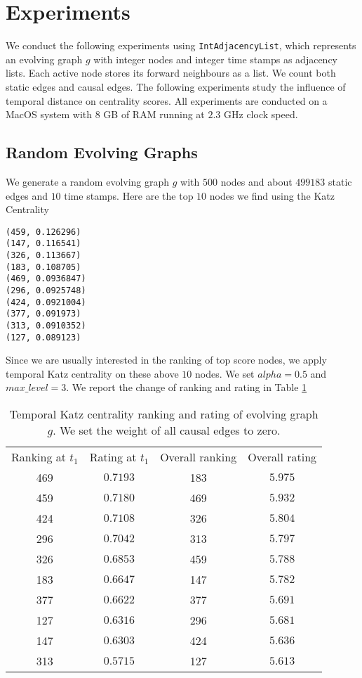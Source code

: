 \documentclass[12pt]{article}
\theoremstyle{definition}
\begin{document}
\section{Experiments}
\label{sec:experiments}

We conduct the following experiments using \texttt{IntAdjacencyList}, which represents an evolving graph $g$ with integer nodes and integer time stamps as adjacency lists. Each active node stores its forward neighbours as a list. We count both static edges and causal edges.
The following experiments study the influence of temporal distance on centrality scores. All experiments are conducted on a MacOS system with $8$ GB of RAM running at $2.3$ GHz clock speed.

\subsection{Random Evolving Graphs}
\label{sec:random}


We generate a random evolving graph $g$ with $500$ nodes and about $499183$ static edges and $10$ time stamps.
Here are the top $10$ nodes we find using the Katz Centrality

\begin{lstlisting}
(459, 0.126296)
(147, 0.116541)
(326, 0.113667)
(183, 0.108705)
(469, 0.0936847)
(296, 0.0925748)
(424, 0.0921004)
(377, 0.091973)
(313, 0.0910352)
(127, 0.089123)
\end{lstlisting}

Since we are usually interested in the ranking of top score nodes,
we apply temporal Katz centrality on these above $10$ nodes.
We set $alpha = 0.5$  and $max\_level = 3$. We report the change of ranking and rating in Table \ref{table:ranking}

  \begin{table}[h]
    \begin{center}
  \begin{tabular}{ c | c | c | c }
    Ranking at $t_1$ & Rating at $t_1$ & Overall ranking & Overall rating \\
     469 & $0.7193$ & 183 & $5.975$ \\
     459 & $0.7180$ & 469 & $5.932$ \\
     424 & $0.7108$ & 326 & $5.804$ \\
     296 & $0.7042$ & 313 & $5.797$ \\
     326 & $0.6853$ & 459 & $5.788$ \\
     183 & $0.6647$ & 147 & $5.782$ \\
     377 & $0.6622$ & 377 & $5.691$ \\
     127 & $0.6316$ & 296 & $5.681$ \\
     147 & $0.6303$ & 424 & $5.636$ \\
     313 & $0.5715$ & 127 & $5.613$ \\
  \end{tabular}
  \end{center}
  \caption{Temporal Katz centrality ranking and rating of evolving graph $g$.
We set the weight of all causal edges to zero.}
  \label{table:ranking}
  \end{table}
\end{document}
